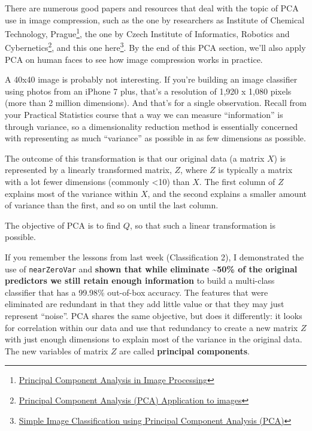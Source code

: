\documentclass[]{article}
\let\rmarkdownfootnote\footnote%
\def\footnote{\protect\rmarkdownfootnote}
\begin{document}
There are numerous good papers and resources that deal with the topic of
PCA use in image compression, such as the one by researchers as
Institute of Chemical Technology, Prague\footnote{\href{https://pdfs.semanticscholar.org/76a7/fc9d87736c8383576865cf50403e53e74848.pdf}{Principal
  Component Analysis in Image Processing}}, the one by Czech Institute
of Informatics, Robotics and Cybernetics\footnote{\href{http://people.ciirc.cvut.cz/~hlavac/TeachPresEn/11ImageProc/15PCA.pdf}{Principal
  Component Analysis (PCA) Application to images}}, and this one
here\footnote{\href{https://ece.gmu.edu/~hayes/courses/MachineLearning/Projects/Presentations/Norko.pdf}{Simple
  Image Classification using Principal Component Analysis (PCA)}}. By
the end of this PCA section, we'll also apply PCA on human faces to see
how image compression works in practice.

A 40x40 image is probably not interesting. If you're building an image
classifier using photos from an iPhone 7 plus, that's a resolution of
1,920 x 1,080 pixels (more than 2 million dimensions). And that's for a
single observation. Recall from your Practical Statistics course that a
way we can measure ``information'' is through variance, so a
dimensionality reduction method is essentially concerned with
representing as much ``variance'' as possible in as few dimensions as
possible.

The outcome of this transformation is that our original data (a matrix
\(X\)) is represented by a linearly transformed matrix, \(Z\), where
\(Z\) is typically a matrix with a lot fewer dimensions (commonly
\textless{}10) than \(X\). The first column of \(Z\) explains most of
the variance within \(X\), and the second explains a smaller amount of
variance than the first, and so on until the last column.

The objective of PCA is to find \(Q\), so that such a linear
transformation is possible.

If you remember the lessons from last week (Classification 2), I
demonstrated the use of \texttt{nearZeroVar} and \textbf{shown that
while eliminate \textasciitilde{}50\% of the original predictors we
still retain enough information} to build a multi-class classifier that
has a 99.98\% out-of-box accuracy. The features that were eliminated are
redundant in that they add little value or that they may just represent
``noise''. PCA shares the same objective, but does it differently: it
looks for correlation within our data and use that redundancy to create
a new matrix \(Z\) with just enough dimensions to explain most of the
variance in the original data. The new variables of matrix \(Z\) are
called \textbf{principal components}.
\end{document}
